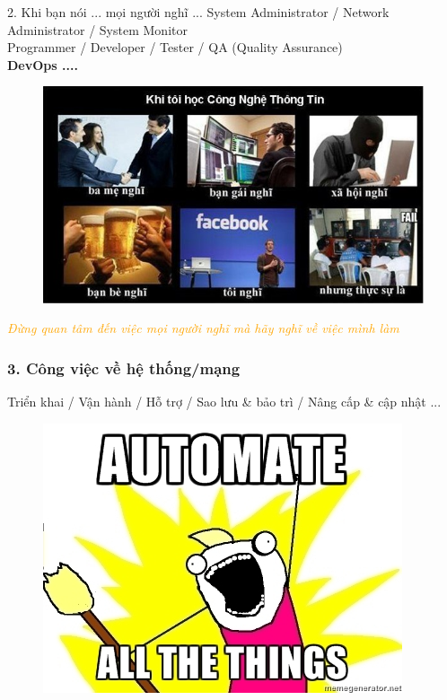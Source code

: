 \documentclass[10pt]{beamer}
\begin{document}
\label{Khi toi noi}
\begin{frame}{2. Khi bạn nói ... mọi người nghĩ ...}
\large{System Administrator / Network Administrator / System Monitor \\
Programmer / Developer  / Tester / QA (Quality Assurance)  \\
\textbf{DevOps ....}} \\ 
\framebreak
\pause
\begin{figure}[!ht]
\centering
			\includegraphics[scale=0.5]{khibannoi}
\end{figure}
\pause
\textcolor{orange}{\textit{Đừng quan tâm đến việc mọi người nghĩ mà hãy nghĩ về việc mình làm}}
\end{frame}
\label{Python & Cong viec}
\begin{frame}
\frametitle{3. Công việc về hệ thống/mạng}
\pause Triển khai \pause / Vận hành \pause / Hỗ trợ \pause / Sao lưu \& bảo trì \pause / Nâng cấp \& cập nhật ...\\
\pause
{}
\label{Chu y tai lieu commnent}
\framebreak
\pause
\begin{figure}[!ht]
\centering
			\includegraphics[scale=0.5]{automate-all-the-things}
\end{figure}
\end{frame}
\end{document}
